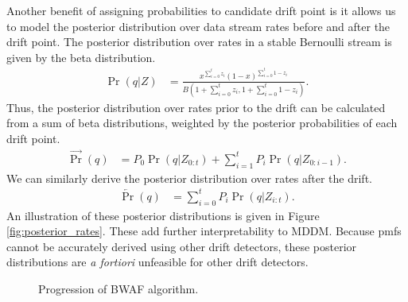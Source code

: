 Another benefit of assigning probabilities to candidate drift point is it allows us to model the posterior distribution over data stream rates before and after the drift point. The posterior distribution over rates in a stable Bernoulli stream is given by the beta distribution.
\begin{align}
  \Pr(q|Z) &= \frac{ x^{\sum_{i=0}^t z_i}(1-x)^{\sum_{i=0}^t 1-z_i} }{B\left(1+\sum_{i=0}^t z_i,1+\sum_{i=0}^t 1-z_i\right)}. \label{eq:rate_posterior}
\end{align}
Thus, the posterior distribution over rates prior to the drift can be calculated from a sum of beta distributions, weighted by the posterior probabilities of each drift point.
\begin{align}
  \overrightarrow{\Pr}(q) &= P_0 \Pr(q|Z_{0:t}) + \sum_{i=1}^t P_i \Pr(q|Z_{0:i-1}).
\end{align}
We can similarly derive the posterior distribution over rates after the drift.
\begin{align}
  \overleftarrow{\Pr}(q) &= \sum_{i=0}^t P_i \Pr(q|Z_{i:t}).
\end{align}
An illustration of these posterior distributions is given in Figure \ref{fig:posterior_rates}. These add further interpretability to MDDM. Because pmfs cannot be accurately derived using other drift detectors, these posterior distributions are {\it a fortiori} unfeasible for other drift detectors.





\begin{figure}
    \centering
    \caption{Progression of BWAF algorithm.}
    \label{fig:bwaf_progress}
\end{figure}


